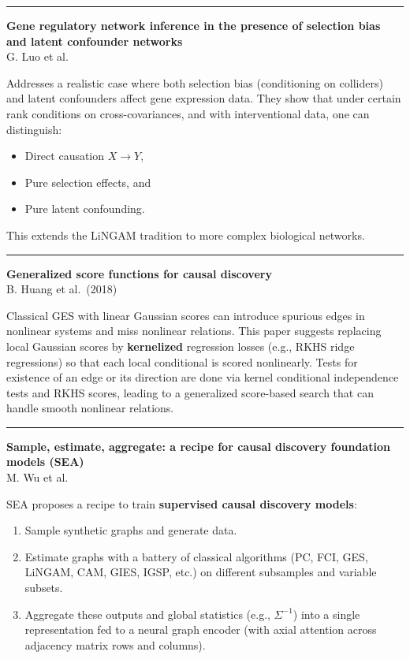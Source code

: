 \documentclass[a5paper]{article}
\providecommand{\tightlist}{%
  \setlength{\itemsep}{0pt}\setlength{\parskip}{0pt}}
\begin{document}
\begin{center}\rule{0.5\linewidth}{0.5pt}\end{center}

\textbf{Gene regulatory network inference in the presence of selection
bias and latent confounder networks}\\
G. Luo et al.

Addresses a realistic case where both selection bias (conditioning on
colliders) and latent confounders affect gene expression data. They show
that under certain rank conditions on cross-covariances, and with
interventional data, one can distinguish:

\begin{itemize}
\tightlist
\item
  Direct causation $X\to Y$,
\item
  Pure selection effects, and
\item
  Pure latent confounding.
\end{itemize}

This extends the LiNGAM tradition to more complex biological networks.

\begin{center}\rule{0.5\linewidth}{0.5pt}\end{center}

\textbf{Generalized score functions for causal discovery}\\
B. Huang et al.~(2018)

Classical GES with linear Gaussian scores can introduce spurious edges
in nonlinear systems and miss nonlinear relations. This paper suggests
replacing local Gaussian scores by \textbf{kernelized} regression losses
(e.g., RKHS ridge regressions) so that each local conditional is scored
nonlinearly. Tests for existence of an edge or its direction are done
via kernel conditional independence tests and RKHS scores, leading to a
generalized score-based search that can handle smooth nonlinear
relations.

\begin{center}\rule{0.5\linewidth}{0.5pt}\end{center}

\textbf{Sample, estimate, aggregate: a recipe for causal discovery
foundation models (SEA)}\\
M. Wu et al.

SEA proposes a recipe to train \textbf{supervised causal discovery
models}:

\begin{enumerate}
\def\labelenumi{\arabic{enumi}.}
\tightlist
\item
  Sample synthetic graphs and generate data.
\item
  Estimate graphs with a battery of classical algorithms (PC, FCI, GES,
  LiNGAM, CAM, GIES, IGSP, etc.) on different subsamples and variable
  subsets.
\item
  Aggregate these outputs and global statistics (e.g., $\Sigma^{-1}$) into a
  single representation fed to a neural graph encoder (with axial
  attention across adjacency matrix rows and columns).
\end{enumerate}
\end{document}
